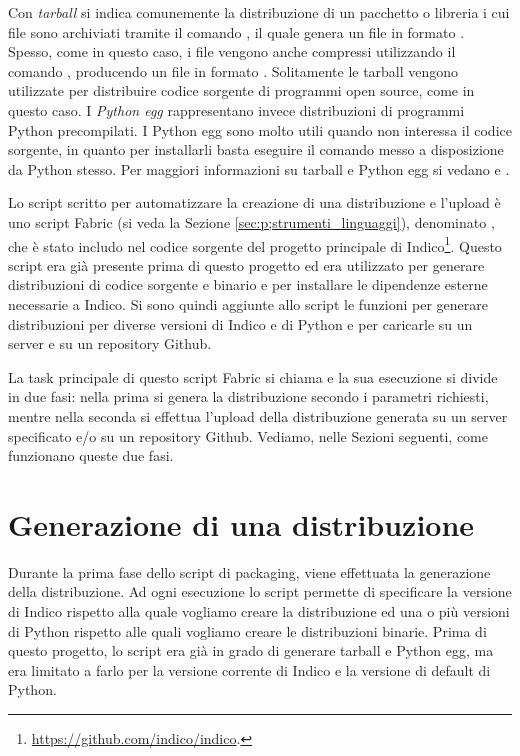     Con \textit{tarball} si indica comunemente la distribuzione di un pacchetto o libreria i cui file sono archiviati tramite il comando , il quale genera un file in formato . Spesso, come in questo caso, i file  vengono anche compressi utilizzando il comando , producendo un file in formato . Solitamente le tarball vengono utilizzate per distribuire codice sorgente di programmi open source, come in questo caso. I \textit{Python egg} rappresentano invece distribuzioni di programmi Python precompilati. I Python egg sono molto utili quando non interessa il codice sorgente, in quanto per installarli basta eseguire il comando  messo a disposizione da Python stesso. Per maggiori informazioni su tarball e Python egg si vedano \cite{scholz:egg} e \cite{wiki:tar}.
    
    Lo script scritto per automatizzare la creazione di una distribuzione e l'upload è uno script Fabric (si veda la Sezione \ref{sec:p;strumenti_linguaggi}), denominato , che è stato includo nel codice sorgente del progetto principale di Indico\footnote{\url{https://github.com/indico/indico}.}. Questo script era già presente prima di questo progetto ed era utilizzato per generare distribuzioni di codice sorgente e binario e per installare le dipendenze esterne necessarie a Indico. Si sono quindi aggiunte allo script le funzioni per generare distribuzioni per diverse versioni di Indico e di Python e per caricarle su un server e su un repository Github.
    
    La task principale di questo script Fabric si chiama  e la sua esecuzione si divide in due fasi: nella prima si genera la distribuzione secondo i parametri richiesti, mentre nella seconda si effettua l'upload della distribuzione generata su un server specificato e/o su un repository Github. Vediamo, nelle Sezioni seguenti, come funzionano queste due fasi.
    
    \section{Generazione di una distribuzione} \label{sec:dp;generazione_distribuzione}
    
        Durante la prima fase dello script di packaging, viene effettuata la generazione della distribuzione. Ad ogni esecuzione lo script permette di specificare la versione di Indico rispetto alla quale vogliamo creare la distribuzione ed una o più versioni di Python rispetto alle quali vogliamo creare le distribuzioni binarie. Prima di questo progetto, lo script era già in grado di generare tarball e Python egg, ma era limitato a farlo per la versione corrente di Indico e la versione di default di Python.
        
